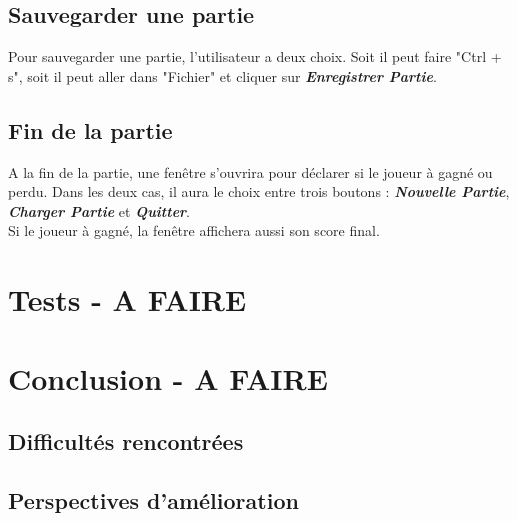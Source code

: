\documentclass[11pt, letterpaper]{article}
\begin{document}
\subsection{Sauvegarder une partie}

\noindent Pour sauvegarder une partie, l'utilisateur a deux choix. Soit il peut faire "Ctrl + s", soit il peut aller dans "Fichier" et cliquer sur \textbf{\textit{Enregistrer Partie}}.

\subsection{Fin de la partie}

\noindent A la fin de la partie, une fenêtre s'ouvrira pour déclarer si le joueur à gagné ou perdu. Dans les deux cas, il aura le choix entre trois boutons : \textbf{\textit{Nouvelle Partie}}, \textbf{\textit{Charger Partie}} et \textbf{\textit{Quitter}}.\\

\noindent Si le joueur à gagné, la fenêtre affichera aussi son score final.

\section{Tests - A FAIRE}

\section{Conclusion - A FAIRE}

\subsection{Difficultés rencontrées}

\subsection{Perspectives d'amélioration}
\end{document}
